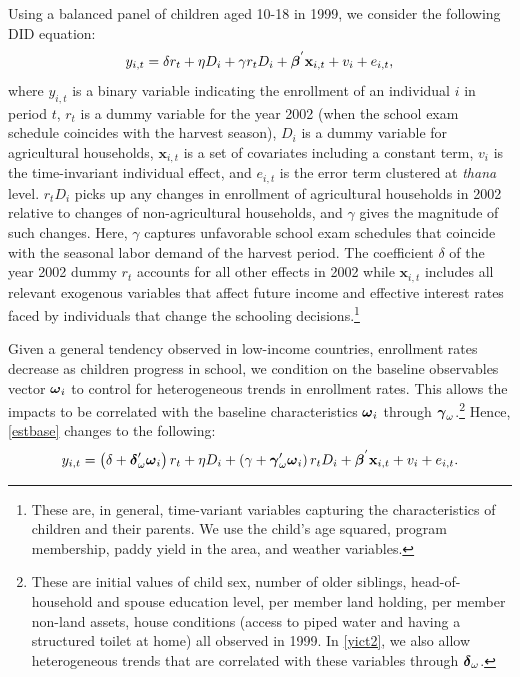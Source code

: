 \documentclass[12pt,letterpaper]{article}
\newcommand{\bfbeta}{\ensuremath{\mbox{\boldmath $\beta$}}}
\newcommand{\bfgamma}{\ensuremath{\mbox{\boldmath $\gamma$}}}
\newcommand{\bfdelta}{\ensuremath{\mbox{\boldmath $\delta$}}}
\newcommand{\bfomega}{\ensuremath{\mbox{\boldmath $\omega$}}}
\newcommand{\0}{\ensuremath{\mbox{\boldmath $0$}}}
\begin{document}
Using a balanced panel of children aged 10-18 in 1999, we consider the following DID equation:
\begin{equation}
y_{i,t} = \delta r_{t} + \eta D_{i} + \gamma r_{t}D_{i} + \bfbeta^{'} \textbf{x}_{i,t} + v_{i} + e_{i,t},
\label{estbase}
\end{equation}
where $y_{i,t}$ is a binary variable indicating the enrollment of an individual $i$ in period $t$, $r_{t}$ is a dummy variable for the year 2002 (when the school exam schedule coincides with the harvest season), $D_{i}$ is a dummy variable for agricultural households, $\textbf{x}_{i,t}$ is a set of covariates including a constant term,  $v_{i}$ is the time-invariant individual effect, and $e_{i,t}$ is the error term clustered at \textit{thana} level. $r_{t}D_{i}$ picks up any changes in enrollment of agricultural households in 2002 relative to changes of non-agricultural households, and $\gamma$ gives the magnitude of such changes. Here, $\gamma$ captures unfavorable school exam schedules that coincide with the seasonal labor demand of the harvest period. The coefficient $\delta$ of the year 2002 dummy $r_{t}$ accounts for all other effects in 2002 while $\textbf{x}_{i,t}$ includes all relevant exogenous variables that affect future income and effective interest rates faced by individuals that change the schooling decisions.\footnote{These are, in general, time-variant variables capturing the characteristics of children and their parents. We use the child's age squared, program membership, paddy yield in the area, and weather variables. }

Given a general tendency observed in low-income countries, enrollment rates decrease as children progress in school, we condition on the baseline observables vector $\bfomega_{i}$ to control for heterogeneous trends in enrollment rates. This allows the impacts to be correlated with the baseline characteristics $\bfomega_{i}$ through $\bfgamma_{\omega}$.\footnote{These are initial values of child sex, number of older siblings, head-of-household and spouse education level, per member land holding, per member non-land assets, house conditions (access to piped water and having a structured toilet at home) all observed in 1999. In \eqref{yict2}, we also allow heterogeneous trends that are correlated with these variables through $\bfdelta_{\omega}$. }
Hence, \eqref{estbase} changes to the following:
\begin{equation}
y_{i,t} = 
\left(\delta +\bfdelta'_{\omega}\bfomega_{i}\right)r_{t} + \eta D_{i} +
\left(\gamma + \bfgamma'_{\omega}\bfomega_{i}\right)r_{t}D_{i} + 
\bfbeta^{'}\textbf{x}_{i,t} + v_{i} + e_{i,t}.
\label{yict2}
\end{equation}
\end{document}
